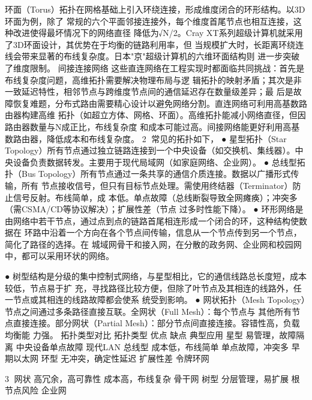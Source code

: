 环面（Torus）拓扑在网格基础上引入环绕连接，形成维度闭合的环形结构。以3D环面为例，除了
常规的六个平面邻接连接外，每个维度首尾节点也相互连接，这种改进使得最坏情况下的网络直径
降低为√N/2。Cray XT系列超级计算机就采用了3D环面设计，其优势在于均衡的链路利用率，但
当规模扩大时，长距离环绕连线会带来显著的布线复杂度。日本"京"超级计算机的六维环面结构则
进一步突破了维度限制。
间接连接网络
这些直连网络在工程实现时都面临共同挑战：首先是布线复杂度问题，高维拓扑需要解决物理布局与逻
辑拓扑的映射矛盾；其次是非一致延迟特性，相邻节点与跨维度节点间的通信延迟存在数量级差异；最
后是故障恢复难题，分布式路由需要精心设计以避免网络分割。直连网络可利用高基数路由器构建高维
拓扑（如超立方体、网格、环面）。高维拓扑能减小网络直径，但因路由器数量与N成正比，布线复杂度
和成本可能过高。间接网络能更好利用高基数路由器，降低成本和布线复杂度。
                                               2
常见的拓扑如下，
 ● 星型拓扑（Star Topology）所有节点通过独立链路连接到一个中央设备（如交换机、集线器）。中
   央设备负责数据转发。主要用于现代局域网（如家庭网络、企业网）。
 ● 总线型拓扑（Bus Topology）所有节点通过一条共享的通信介质连接。数据以广播形式传输，所有
   节点接收信号，但只有目标节点处理。需使用终结器（Terminator）防止信号反射。布线简单，成
   本低。单点故障（总线断裂导致全网瘫痪）；冲突多（需CSMA/CD等协议解决）；扩展性差（节点
   过多时性能下降）。
 ● 环形网络是由网络中若干节点，通过点到点的链路首尾相连形成一个闭合的环，这种结构使数据在
   环路中沿着一个方向在各个节点间传输，信息从一个节点传到另一个节点，简化了路径的选择。在
   城域网骨干和接入网，在分散的政务网、企业网和校园网中，都可以采用环状的网络。




 ● 树型结构是分级的集中控制式网络，与星型相比，它的通信线路总长度短，成本较低，节点易于扩
   充，寻找路径比较方便，但除了叶节点及其相连的线路外，任一节点或其相连的线路故障都会使系
   统受到影响。
 ● 网状拓扑（Mesh Topology）节点之间通过多条路径直接互联。全网状（Full Mesh）：每个节点与
   其他所有节点直接连接。部分网状（Partial Mesh）：部分节点间直接连接。容错性高，负载均衡能
   力强。
拓扑类型对比
拓扑类型           优点            缺点            典型应用
星型             易管理，故障隔离      中央设备单点故障      现代LAN
总线型            成本低，布线简单      单点故障，冲突多      早期以太网
环型             无冲突，确定性延迟     扩展性差          令牌环网

                                                        3
网状            高冗余，高可靠性      成本高，布线复杂      骨干网
树型            分层管理，易扩展      根节点风险         企业网

